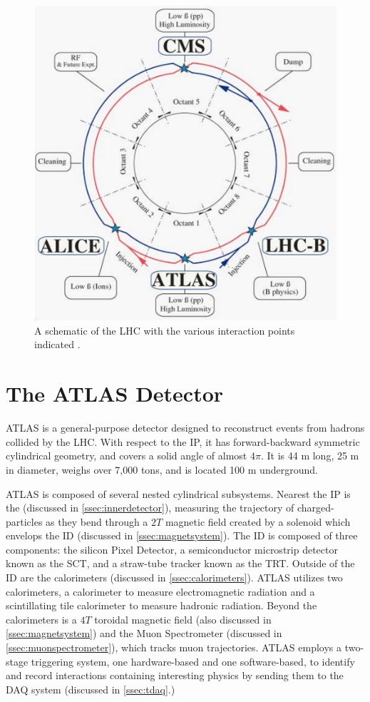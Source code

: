 \begin{figure}[!ht]
    \centering
    \includegraphics[width=.7\textwidth]{chapters/chapter2_experiment/images/lhc_interaction_points.png}
    \caption[A schematic of the LHC with the various interaction points indicated]{A schematic of the LHC with the various interaction points indicated \cite{lhc}.}
    \label{fig:lhc}
\end{figure}


\section{The ATLAS Detector}

ATLAS \cite{atlas-experiment} is a general-purpose detector designed to reconstruct events from hadrons collided by the \gls{LHC}. With respect to the \gls{IP}, it has forward-backward symmetric cylindrical geometry, and covers a solid angle of almost $4\pi$. It is 44 m long, 25 m in diameter, weighs over 7,000 tons, and is located 100 m underground. 

ATLAS is composed of several nested cylindrical subsystems. Nearest the \gls{IP} is the  (discussed in \ref{ssec:innerdetector}), measuring the trajectory of charged-particles as they bend through a $\unit{2}{T}$ magnetic field created by a solenoid which envelops the \gls{ID} (discussed in \ref{ssec:magnetsystem}). The \gls{ID} is composed of three components: the silicon Pixel Detector, a semiconductor microstrip detector known as the \gls{SCT}, and a straw-tube tracker known as the \gls{TRT}. Outside of the \gls{ID} are the calorimeters (discussed in \ref{ssec:calorimeters}). ATLAS utilizes two calorimeters, a  calorimeter to measure electromagnetic radiation and a scintillating tile calorimeter to measure hadronic radiation. Beyond the calorimeters is a $\unit{4}{T}$ toroidal magnetic field (also discussed in \ref{ssec:magnetsystem}) and the Muon Spectrometer (discussed in \ref{ssec:muonspectrometer}), which tracks muon trajectories. ATLAS employs a two-stage triggering system, one hardware-based and one software-based, to identify and record interactions containing interesting physics by sending them to the \gls{DAQ} system (discussed in \ref{ssec:tdaq}.)

